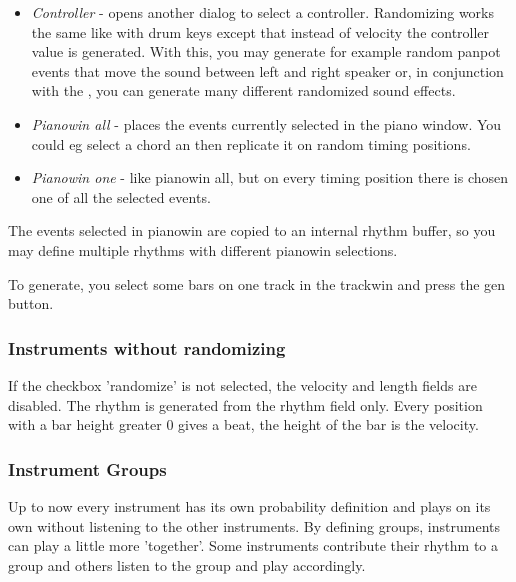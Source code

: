 \documentclass[letterpaper]{report}
\begin{document}
\begin{itemize}
\item {\em Controller} - opens another dialog to select a controller.
Randomizing works the same like with drum keys except that instead of
velocity the controller value is generated. With this, you may generate for
example random panpot events that move the sound between left and
right speaker or, in conjunction with the ,
you can generate many different randomized sound effects.
\item {\em Pianowin all} - places the events currently selected in the piano
window. You could eg select a chord an then replicate it on random timing
positions.
\item {\em Pianowin one} - like pianowin all, but on every timing position
there is chosen one of all the selected events.
\end{itemize}

The events selected in pianowin are copied to an internal rhythm buffer, so
you may define multiple rhythms with different pianowin selections.

To generate, you select some bars on one track in the trackwin and press the
gen button.



\subsubsection{Instruments without randomizing}

If the checkbox 'randomize' is not selected, the velocity and length
fields are disabled. The rhythm is generated from the rhythm field only.
Every position with a bar height greater 0 gives a beat, the height of
the bar is the velocity.


\subsubsection{Instrument Groups}

Up to now every instrument has its own probability definition and plays
on its own without listening to the other instruments. By defining groups,
instruments can play a little more 'together'. Some instruments contribute
their rhythm to a group and others listen to the group and play
accordingly.
\end{document}
